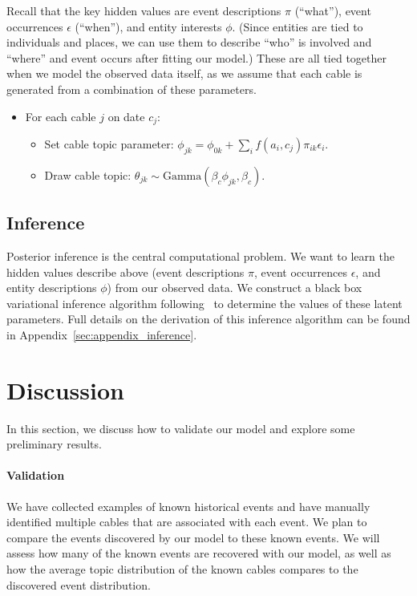 Recall that the key hidden values are event descriptions $\pi$ (``what''), event occurrences $\epsilon$ (``when''), and entity interests $\phi$.  (Since entities are tied to individuals and places, we can use them to describe ``who'' is involved and ``where'' and event occurs after fitting our model.)  These are all tied together when we model the observed data itself, as we assume that each cable is generated from a combination of these parameters.
\begin{itemize}
\item For each cable $j$ on date $c_j$:
\begin{itemize}
	\item Set cable topic parameter: $\phi_{jk} = \phi_{0k} + \sum_i f(a_i, c_j) \pi_{ik} \epsilon_i$.
	\item Draw cable topic: $\theta_{jk} \sim \mbox{Gamma}(\beta_c \phi_{jk}, \beta_c)$.
\end{itemize}
\end{itemize}



\subsection{Inference}
Posterior inference is the central computational problem.  We want to learn the hidden values describe above (event descriptions $\pi$, event occurrences $\epsilon$, and entity descriptions $\phi$) from our observed data.  We construct a black box variational inference algorithm following~\citet{Ranganath:2014} to determine the values of these latent parameters.  Full details on the derivation of this inference algorithm can be found in Appendix~\ref{sec:appendix_inference}.

\section{Discussion}
In this section, we discuss how to validate our model and explore some preliminary results.

\paragraph{Validation}
We have collected examples of known historical events and have manually identified multiple cables that are associated with each event.  We plan to compare the events discovered by our model to these known events.  We will assess how many of the known events are recovered with our model, as well as how the average topic distribution of the known cables compares to the discovered event distribution.


